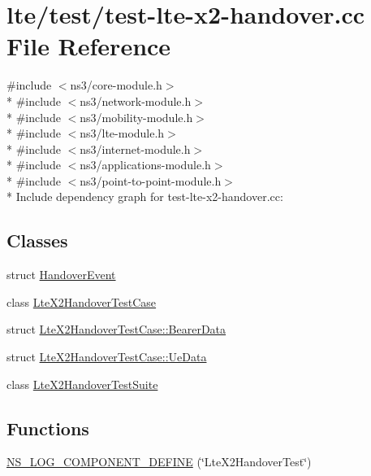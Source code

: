 \hypertarget{test-lte-x2-handover_8cc}{}\section{lte/test/test-\/lte-\/x2-\/handover.cc File Reference}
\label{test-lte-x2-handover_8cc}
{\ttfamily \#include $<$ns3/core-\/module.\+h$>$}\\*
{\ttfamily \#include $<$ns3/network-\/module.\+h$>$}\\*
{\ttfamily \#include $<$ns3/mobility-\/module.\+h$>$}\\*
{\ttfamily \#include $<$ns3/lte-\/module.\+h$>$}\\*
{\ttfamily \#include $<$ns3/internet-\/module.\+h$>$}\\*
{\ttfamily \#include $<$ns3/applications-\/module.\+h$>$}\\*
{\ttfamily \#include $<$ns3/point-\/to-\/point-\/module.\+h$>$}\\*
Include dependency graph for test-\/lte-\/x2-\/handover.cc\+:
\subsection*{Classes}
\begin{DoxyCompactItemize}
\item 
struct \hyperlink{structHandoverEvent}{Handover\+Event}
\item 
class \hyperlink{classLteX2HandoverTestCase}{Lte\+X2\+Handover\+Test\+Case}
\item 
struct \hyperlink{structLteX2HandoverTestCase_1_1BearerData}{Lte\+X2\+Handover\+Test\+Case\+::\+Bearer\+Data}
\item 
struct \hyperlink{structLteX2HandoverTestCase_1_1UeData}{Lte\+X2\+Handover\+Test\+Case\+::\+Ue\+Data}
\item 
class \hyperlink{classLteX2HandoverTestSuite}{Lte\+X2\+Handover\+Test\+Suite}
\end{DoxyCompactItemize}
\subsection*{Functions}
\begin{DoxyCompactItemize}
\item 
\hyperlink{test-lte-x2-handover_8cc_acbb600d33a2a958f7e35316f0869d8b9}{N\+S\+\_\+\+L\+O\+G\+\_\+\+C\+O\+M\+P\+O\+N\+E\+N\+T\+\_\+\+D\+E\+F\+I\+NE} (\char`\"{}Lte\+X2\+Handover\+Test\char`\"{})
\end{DoxyCompactItemize}

